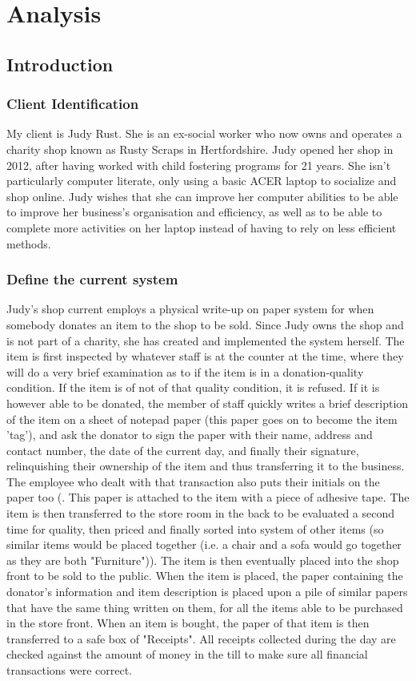 \chapter{Analysis}

\section{Introduction}

\subsection{Client Identification}
My client is Judy Rust. She is an ex-social worker who now owns and operates a charity shop known as Rusty Scraps in Hertfordshire. Judy opened her shop in 2012, after having worked with child fostering programs for 21 years. She isn't particularly computer literate, only using a basic ACER laptop to socialize and shop online. Judy wishes that she can improve her computer abilities to be able to improve her business's organisation and efficiency, as well as to be able to complete more activities on her laptop instead of having to rely on less efficient methods.
\subsection{Define the current system}
Judy's shop current employs a physical write-up on paper system for when somebody donates an item to the shop to be sold. Since Judy owns the shop and is not part of a charity, she has created and implemented the system herself. The item is first inspected by whatever staff is at the counter at the time, where they will do a very brief examination as to if the item is in a donation-quality condition. If the item is of not of that quality condition, it is refused. If it is however able to be donated, the member of staff quickly writes a brief description of the item on a sheet of notepad paper (this paper goes on to become the item 'tag'), and ask the donator to sign the paper with their name, address and contact number, the date of the current day, and finally their signature, relinquishing their ownership of the item and thus transferring it to the business. The employee who dealt with that transaction also puts their initials on the paper too (. This paper is attached to the item with a piece of adhesive tape.
The item is then transferred to the store room in the back to be evaluated a second time for quality, then priced and finally sorted into system of other items (so similar items would be placed together (i.e. a chair and a sofa would go together as they are both "Furniture")). The item is then eventually placed into the shop front to be sold to the public. When the item is placed, the paper containing the donator's information and item description is placed upon a pile of similar papers that have the same thing written on them, for all the items able to be purchased in the store front. When an item is bought, the paper of that item is then transferred to a safe box of "Receipts". All receipts collected during the day are checked against the amount of money in the till to make sure all financial transactions were correct.

